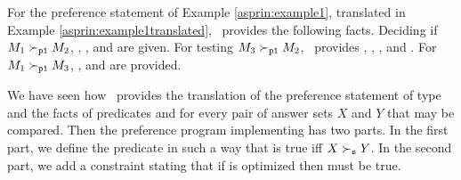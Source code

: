 \begin{example}
For the preference statement  of Example \ref{asprin:example1}, 
translated in Example \ref{asprin:example1translated}, \asprin\ provides the following facts. 
Deciding if $M_1 \succ_{\texttt{p1}} M_2$,  
, ,  and  are given.
For testing $M_3 \succ_{\texttt{p1}} M_2$, \asprin\ provides 
, , ,  and .
For $M_1 \succ_{\texttt{p1}} M_3$, 
,  and  are provided.
\end{example}

We have seen how \asprin\ provides the translation of the preference statement  of type  
and the facts of predicates  and  
for every pair of answer sets $X$ and $Y$ that may be compared.
Then the preference program implementing  has two parts.
In the first part, we define the predicate  
in such a way that  is true 
iff $X \succ_{\texttt{s}} Y$.
In the second part, we add a constraint stating that 
if  is optimized then  must be true. 

